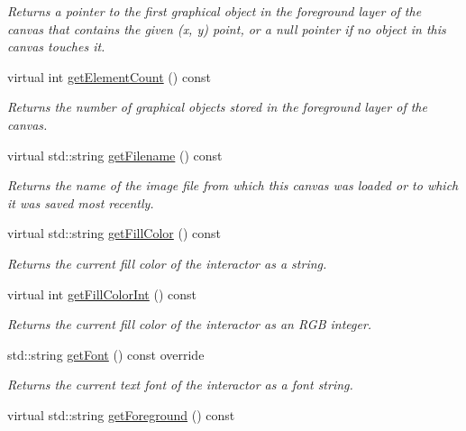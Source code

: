 \begin{DoxyCompactItemize}
\begin{DoxyCompactList}\small\item\em Returns a pointer to the first graphical object in the foreground layer of the canvas that contains the given (x, y) point, or a null pointer if no object in this canvas touches it. \end{DoxyCompactList}\item 
virtual int \mbox{\hyperlink{classsgl_1_1GCanvas_adf7d37ec315f859648def92e6b32408f}{get\+Element\+Count}} () const
\begin{DoxyCompactList}\small\item\em Returns the number of graphical objects stored in the foreground layer of the canvas. \end{DoxyCompactList}\item 
virtual std\+::string \mbox{\hyperlink{classsgl_1_1GCanvas_a2011812670c3de9747702e3c052b6bb3}{get\+Filename}} () const
\begin{DoxyCompactList}\small\item\em Returns the name of the image file from which this canvas was loaded or to which it was saved most recently. \end{DoxyCompactList}\item 
virtual std\+::string \mbox{\hyperlink{classsgl_1_1GDrawingSurface_a76f6964a11fde7c78e9751be184e1a3c}{get\+Fill\+Color}} () const
\begin{DoxyCompactList}\small\item\em Returns the current fill color of the interactor as a string. \end{DoxyCompactList}\item 
virtual int \mbox{\hyperlink{classsgl_1_1GDrawingSurface_a88f4508d9271c4b5f5b5d6b780f223d0}{get\+Fill\+Color\+Int}} () const
\begin{DoxyCompactList}\small\item\em Returns the current fill color of the interactor as an R\+GB integer. \end{DoxyCompactList}\item 
std\+::string \mbox{\hyperlink{classsgl_1_1GCanvas_aa0829769ac6325b5c58d27c8e363cb78}{get\+Font}} () const override
\begin{DoxyCompactList}\small\item\em Returns the current text font of the interactor as a font string. \end{DoxyCompactList}\item 
virtual std\+::string \mbox{\hyperlink{classsgl_1_1GInteractor_a4fa2d8b0192a3a5b4af4bbfe71194d03}{get\+Foreground}} () const

\end{DoxyCompactItemize}
